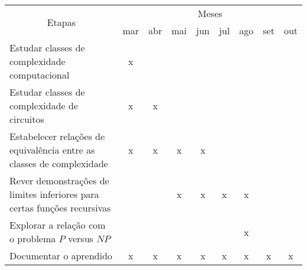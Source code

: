 \documentclass[12pt]{letter}
\begin{document}
\begin{tabularx}{\linewidth}{|X|*{8}{c|}}
    \hline
    \multicolumn{1}{|c|}{\multirow{2}{*}{Etapas}} & \multicolumn{8}{|c|}{Meses}\\ \cline{2-9}
    & mar & abr & mai & jun & jul & ago & set & out \\ \hline

    Estudar classes de complexidade computacional
    &  x  &     &     &     &     &     &     &     \\ \hline

    Estudar classes de complexidade de circuitos
    &  x  &  x  &     &     &     &     &     &     \\ \hline

    Estabelecer relações de equivalência entre as classes de complexidade
    &  x  &  x  &  x  &  x  &     &     &     &     \\ \hline

    Rever demonstrações de limites inferiores para certas funções recursivas
    &     &     &  x  &  x  &  x  &  x  &     &     \\ \hline

    Explorar a relação com o problema $P$ versus $NP$
    &     &     &     &     &     &  x  &     &     \\ \hline

    Documentar o aprendido
    &  x  &  x  &  x  &  x  &  x  &  x  &  x  &  x  \\ \hline

\end{tabularx}
\end{document}
